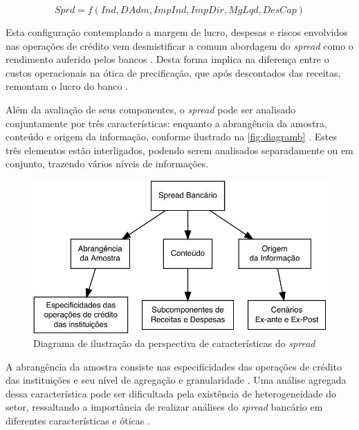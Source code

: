 \documentclass[
  12pt,
  12pt,
  openright,
  oneside,
  a4paper,
  chapter=TITLE,
  section=TITLE,
  subsection=TITLE,
  subsubsection=TITLE,
  english,
  portugues,
  sumario=tradicional]{abntex2}
\begin{document}
\begin{equation}
Sprd=f(Ind, DAdm, ImpInd, ImpDir, MgLqd, DesCap)
\end{equation}

Esta configuração contemplando a margem de lucro, despesas e riscos envolvidos nas operações de crédito vem desmistificar a comum abordagem do \emph{spread} como o rendimento auferido pelos bancos \cite{costa;nakane:2004, dantas:2012}. Desta forma implica na diferença entre o custos operacionais na ótica de precificação, que após descontados das receitas, remontam o lucro do banco \cite{BCB:2016}.

Além da avaliação de seus componentes, o \emph{spread} pode ser analisado
conjuntamente por três características: enquanto a abrangência da amostra,
conteúdo e origem da informação, conforme ilustrado na \autoref{fig:diagramb} \cite{leal:2006}. Estes três elementos estão interligados, podendo serem analisados separadamente ou em conjunto, trazendo vários níveis de informações.

\begin{figure}[!hbtp]
\vspace{20pt}
\caption{Diagrama de ilustração da perspectiva de características do \emph{spread}}
\vspace{-4mm}

\begin{center}\includegraphics{12-exportedfigures/diagram.spread.carac-1} \end{center}
\vspace{-3mm}
\label{fig:diagramb}
\vspace{-2mm}
\end{figure}

A abrangência da amostra consiste nas especificidades das operações de crédito das instituições e seu nível de agregação e granularidade \cite{costa;nakane:2004}. Uma análise agregada dessa característica pode ser dificultada pela existência de heterogeneidade do setor, ressaltando a importância de realizar análises do \emph{spread} bancário em diferentes características e óticas \cite{block:2000}.
\end{document}

